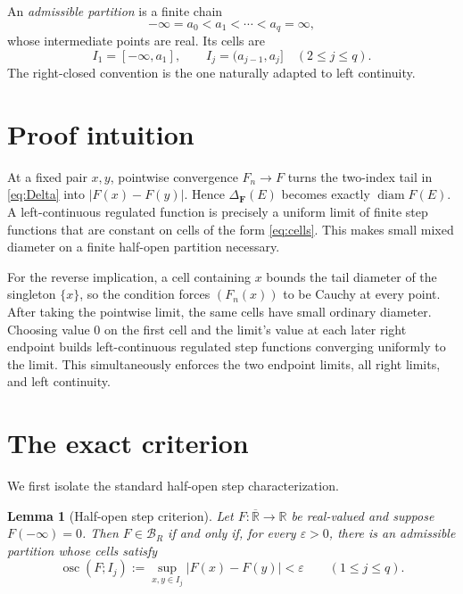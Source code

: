 \documentclass[11pt]{article}
\newtheorem{lemma}[theorem]{Lemma}
\newcommand{\R}{\mathbb R}
\newcommand{\Rbar}{\overline{\mathbb R}}
\newcommand{\BR}{\mathcal B_R}
\newcommand{\diam}{\operatorname{diam}}
\newcommand{\osc}{\operatorname{osc}}
\begin{document}
An \emph{admissible partition} is a finite chain
\[
 -\infty=a_0<a_1<\cdots<a_q=\infty,
\]
whose intermediate points are real.  Its cells are
\begin{equation}\label{eq:cells}
 I_1=[-\infty,a_1],
 \qquad
 I_j=(a_{j-1},a_j]\quad(2\leq j\leq q).
\end{equation}
The right-closed convention is the one naturally adapted to left
continuity.

\section{Proof intuition}

At a fixed pair \(x,y\), pointwise convergence \(F_n\to F\) turns the
two-index tail in \eqref{eq:Delta} into \(|F(x)-F(y)|\).  Hence
\(\Delta_{\mathbf F}(E)\) becomes exactly \(\diam F(E)\).
A left-continuous regulated function is precisely a uniform limit of finite
step functions that are constant on cells of the form \eqref{eq:cells}.
This makes small mixed diameter on a finite half-open partition necessary.

For the reverse implication, a cell containing \(x\) bounds the tail
diameter of the singleton \(\{x\}\), so the condition forces
\((F_n(x))\) to be Cauchy at every point.  After taking the pointwise limit,
the same cells have small ordinary diameter.  Choosing value \(0\) on the
first cell and the limit's value at each later right endpoint builds
left-continuous regulated step functions converging uniformly to the limit.
This simultaneously enforces the two endpoint limits, all right limits, and
left continuity.

\section{The exact criterion}

We first isolate the standard half-open step characterization.

\begin{lemma}[Half-open step criterion]\label{lem:step}
Let \(F:\Rbar\to\R\) be real-valued and suppose \(F(-\infty)=0\).
Then \(F\in\BR\) if and only if, for every \(\varepsilon>0\), there is an
admissible partition whose cells satisfy
\[
 \osc(F;I_j):=\sup_{x,y\in I_j}|F(x)-F(y)|<\varepsilon
 \qquad(1\leq j\leq q).
\]
\end{lemma}
\end{document}
